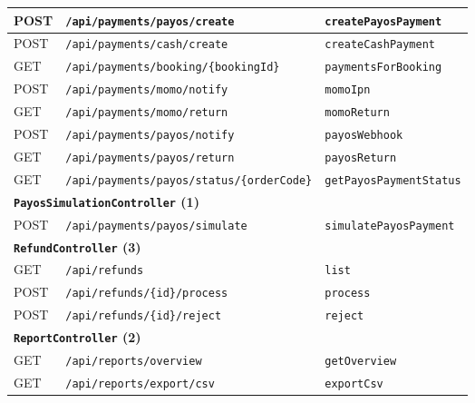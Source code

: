 {\begin{longtable}{|p{1.5cm}|p{7.3cm}|p{5.0cm}|}
\hline
POST & \texttt{/\allowbreak api/\allowbreak payments/\allowbreak payos/\allowbreak create} & \texttt{createPayosPayment} \\
\hline
POST & \texttt{/\allowbreak api/\allowbreak payments/\allowbreak cash/\allowbreak create} & \texttt{createCashPayment} \\
\hline
GET & \texttt{/\allowbreak api/\allowbreak payments/\allowbreak booking/\allowbreak \{bookingId\}} & \texttt{paymentsForBooking} \\
\hline
POST & \texttt{/\allowbreak api/\allowbreak payments/\allowbreak momo/\allowbreak notify} & \texttt{momoIpn} \\
\hline
GET & \texttt{/\allowbreak api/\allowbreak payments/\allowbreak momo/\allowbreak return} & \texttt{momoReturn} \\
\hline
POST & \texttt{/\allowbreak api/\allowbreak payments/\allowbreak payos/\allowbreak notify} & \texttt{payosWebhook} \\
\hline
GET & \texttt{/\allowbreak api/\allowbreak payments/\allowbreak payos/\allowbreak return} & \texttt{payosReturn} \\
\hline
GET & \texttt{/\allowbreak api/\allowbreak payments/\allowbreak payos/\allowbreak status/\allowbreak \{orderCode\}} & \texttt{getPayosPaymentStatus} \\
\hline
\multicolumn{3}{|l|}{\textbf{\texttt{PayosSimulationController} (1)}} \\
\hline
POST & \texttt{/\allowbreak api/\allowbreak payments/\allowbreak payos/\allowbreak simulate} & \texttt{simulatePayosPayment} \\
\hline
\multicolumn{3}{|l|}{\textbf{\texttt{RefundController} (3)}} \\
\hline
GET & \texttt{/\allowbreak api/\allowbreak refunds} & \texttt{list} \\
\hline
POST & \texttt{/\allowbreak api/\allowbreak refunds/\allowbreak \{id\}/\allowbreak process} & \texttt{process} \\
\hline
POST & \texttt{/\allowbreak api/\allowbreak refunds/\allowbreak \{id\}/\allowbreak reject} & \texttt{reject} \\
\hline
\multicolumn{3}{|l|}{\textbf{\texttt{ReportController} (2)}} \\
\hline
GET & \texttt{/\allowbreak api/\allowbreak reports/\allowbreak overview} & \texttt{getOverview} \\
\hline
GET & \texttt{/\allowbreak api/\allowbreak reports/\allowbreak export/\allowbreak csv} & \texttt{exportCsv} \\

\end{longtable}}
